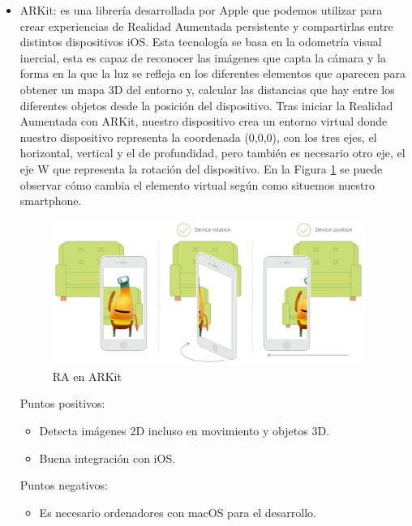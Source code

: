 \begin{itemize}
    \item ARKit\cite{arkit}: es una librería desarrollada por Apple que
    podemos utilizar para crear experiencias de Realidad Aumentada persistente y
    compartirlas entre distintos dispositivos iOS. 
    Esta tecnología se basa en la odometría visual inercial,
    esta es capaz de reconocer las imágenes que capta la cámara y la forma en
    la que la luz se refleja en los diferentes elementos que aparecen para
    obtener un mapa 3D del entorno y, calcular las distancias que hay entre los
    diferentes objetos desde la posición del dispositivo.
    Tras iniciar la Realidad Aumentada con ARKit,
    nuestro dispositivo crea un entorno virtual donde nuestro
    dispositivo representa la coordenada (0,0,0), con los tres ejes,
    el horizontal, vertical y el de profundidad, pero también es necesario
    otro eje, el eje W que representa la rotación del dispositivo. En la Figura
    \ref{fig:arkit} se puede observar cómo cambia el elemento virtual según como
    situemos nuestro smartphone.

    \begin{figure}[H]
        \centering
        \includegraphics[width=4in]{figures/chapter-2/arkit.png}
        \caption{RA en ARKit\cite{arkitimage}}
        \label{fig:arkit}
    \end{figure}

    Puntos positivos:
    \begin{itemize}
        \item Detecta imágenes 2D incluso en movimiento y objetos 3D.
        \item Buena integración con iOS.
    \end{itemize}
    Puntos negativos:
    \begin{itemize}
        \item Es necesario ordenadores con macOS para el desarrollo.
    \end{itemize}



\end{itemize}
